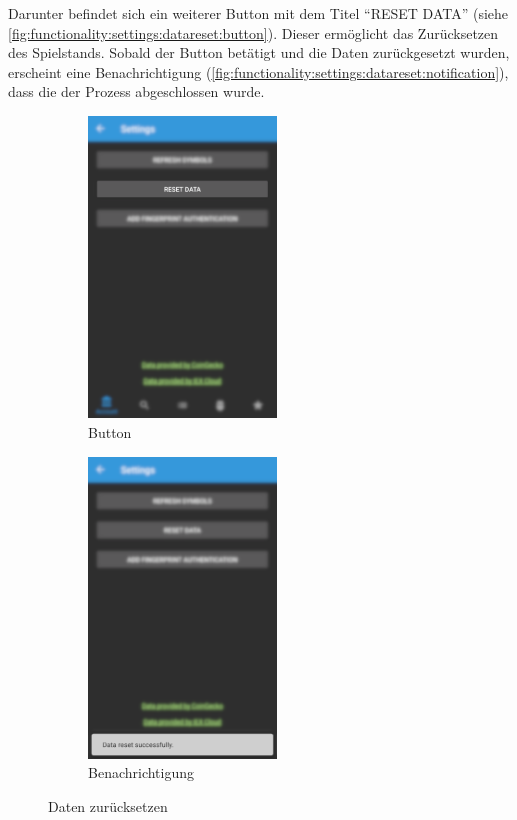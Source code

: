 \documentclass[a4paper]{article}
\begin{document}
Darunter befindet sich ein weiterer Button mit dem Titel "`RESET DATA"' (siehe \autoref{fig:functionality:settings:datareset:button}). Dieser ermöglicht das Zurücksetzen des Spielstands. Sobald der Button betätigt und die Daten zurückgesetzt wurden, erscheint eine Benachrichtigung (\autoref{fig:functionality:settings:datareset:notification}), dass die der Prozess abgeschlossen wurde.

\begin{figure}[H]
    \begin{subfigure}{.5\textwidth}
        \centering
        \includegraphics[height=8cm,keepaspectratio]{./images/settings/data_reset_button.png}
        \caption{Button}
        \label{fig:functionality:settings:datareset:button}
    \end{subfigure}
    \begin{subfigure}{.5\textwidth}
        \centering
        \includegraphics[height=8cm,keepaspectratio]{./images/settings/data_reset_done.png}
        \caption{Benachrichtigung}
        \label{fig:functionality:settings:datareset:notification}
    \end{subfigure}
    \caption{Daten zurücksetzen}
    \label{fig:functionality:settings:datareset}
\end{figure}
\end{document}
